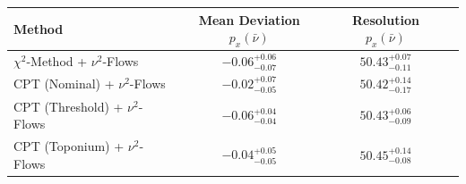     \begin{tabular}{lccc}
        \toprule
        Method & Mean Deviation $p_{x}(\bar{\nu})$ & Resolution $p_{x}(\bar{\nu})$ \\
        \midrule
        $\chi^2$-Method + $\nu^2$-Flows & $-0.06^{+0.06}_{-0.07}$ & $50.43^{+0.07}_{-0.11}$ \\
        CPT (Nominal) + $\nu^2$-Flows & $-0.02^{+0.07}_{-0.05}$ & $50.42^{+0.14}_{-0.17}$ \\
        CPT (Threshold) + $\nu^2$-Flows & $-0.06^{+0.04}_{-0.04}$ & $50.43^{+0.06}_{-0.09}$ \\
        CPT (Toponium) + $\nu^2$-Flows & $-0.04^{+0.05}_{-0.05}$ & $50.45^{+0.14}_{-0.08}$ \\
        \bottomrule
    \end{tabular}